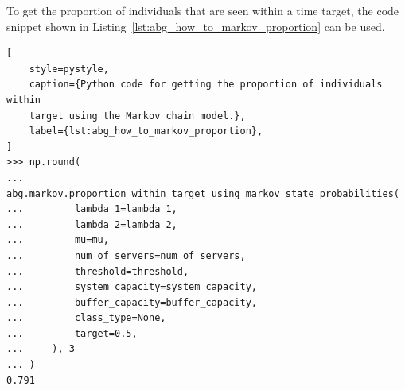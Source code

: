 To get the proportion of individuals that are seen within a time target, the
code snippet shown in Listing~\ref{lst:abg_how_to_markov_proportion} can be
used.

\begin{lstlisting}[
    style=pystyle,
    caption={Python code for getting the proportion of individuals within
    target using the Markov chain model.},
    label={lst:abg_how_to_markov_proportion},
]
>>> np.round(
...     abg.markov.proportion_within_target_using_markov_state_probabilities(
...         lambda_1=lambda_1,
...         lambda_2=lambda_2,
...         mu=mu,
...         num_of_servers=num_of_servers,
...         threshold=threshold,
...         system_capacity=system_capacity,
...         buffer_capacity=buffer_capacity,
...         class_type=None,
...         target=0.5,
...     ), 3
... )
0.791

\end{lstlisting}
